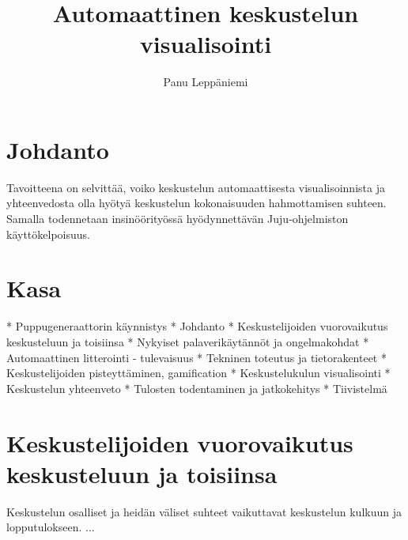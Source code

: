 \documentclass[11pt,a4paper,oneside]{memoir}
\author{Panu Leppäniemi}
\title{Automaattinen keskustelun visualisointi}
\begin{document}
\pagestyle{myheadings}
\markright{}



\pagestyle{empty} %
\tableofcontents*
\pagestyle{empty} %
\clearpage
\pagestyle{plain}




\setcounter{page}{1} %

\chapter{Johdanto}
Tavoitteena on selvittää, voiko keskustelun automaattisesta visualisoinnista ja yhteenvedosta olla hyötyä keskustelun kokonaisuuden hahmottamisen suhteen. Samalla todennetaan insinöörityössä hyödynnettävän Juju-ohjelmiston käyttökelpoisuus.

\chapter{Kasa}
* Puppugeneraattorin käynnistys
* Johdanto
* Keskustelijoiden vuorovaikutus keskusteluun ja toisiinsa
* Nykyiset palaverikäytännöt ja ongelmakohdat
* Automaattinen litterointi - tulevaisuus
* Tekninen toteutus ja tietorakenteet
* Keskustelijoiden pisteyttäminen, gamification
* Keskustelukulun visualisointi
* Keskustelun yhteenveto
* Tulosten todentaminen ja jatkokehitys
* Tiivistelmä

\chapter{Keskustelijoiden vuorovaikutus keskusteluun ja toisiinsa}
Keskustelun osalliset ja heidän väliset suhteet vaikuttavat keskustelun kulkuun ja lopputulokseen.
...
\end{document}
